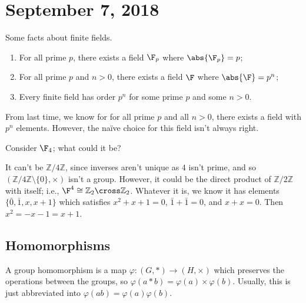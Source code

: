 \section{September 7, 2018}

Some facts about finite fields.
\begin{enumerate}
\item For all prime $p$, there exists a field $\F_p$ where $\abs{\F_p} = p$;
\item For all prime $p$ and $n > 0$, there exists a field $\F$ where $\abs{\F} = p^n$;
\item Every finite field has order $p^n$ for some prime $p$ and some $n > 0$.
\end{enumerate}

From last time, we know for for all prime $p$ and all $n > 0$, there exists a field with $p^n$ elements. However, the naïve choice for this field isn't always right.

\begin{example}
Consider $\F_4$; what could it be?
\end{example}

\begin{solution}
It can't be $\mathbb{Z}/4\mathbb{Z}$, since inverses aren't unique as $4$ isn't prime, and so $(\mathbb{Z}/4\mathbb{Z} \setminus \{0\}, \times)$ isn't a group. However, it could be the direct product of $\mathbb{Z}/2\mathbb{Z}$ with itself; i.e., $\F^4 \cong \mathbb{Z}_2 \cross \mathbb{Z}_2$. Whatever it is, we know it has elements $\{\bar{0},\bar{1}, x, x+1\}$ which satisfies $x^2 + x + 1 = 0$, $\bar{1} + \bar{1} = 0$, and $x + x = 0$. Then $x^2 = -x-1 = x+1$.
\end{solution}

\subsection{Homomorphisms}

\begin{definition}[Homomorphism]
A group homomorphism is a map $\varphi : (G, \ast) \to (H, \times)$ which preserves the operations between the groups, so $\varphi(a \ast b) = \varphi(a) \times \varphi(b)$. Usually, this is just abbreviated into $\varphi(ab) = \varphi(a)\varphi(b)$.
\end{definition}

